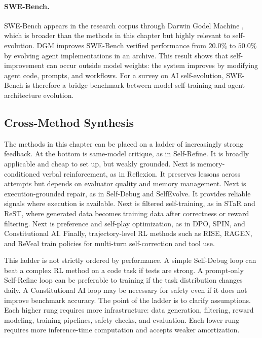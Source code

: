 \paragraph{SWE-Bench.} SWE-Bench \cite{swebench2023} appears in the research corpus through Darwin Godel Machine \cite{zhang2025darwin}, which is broader than the methods in this chapter but highly relevant to self-evolution. DGM \cite{zhang2025darwin} improves SWE-Bench verified performance from $20.0\%$ to $50.0\%$ by evolving agent implementations in an archive. This result shows that self-improvement can occur outside model weights: the system improves by modifying agent code, prompts, and workflows. For a survey on AI self-evolution, SWE-Bench is therefore a bridge benchmark between model self-training and agent architecture evolution.

\subsection{Cross-Method Synthesis}
\label{subsec:cross-method-synthesis}

The methods in this chapter can be placed on a ladder of increasingly strong feedback. At the bottom is same-model critique, as in Self-Refine. It is broadly applicable and cheap to set up, but weakly grounded. Next is memory-conditioned verbal reinforcement, as in Reflexion. It preserves lessons across attempts but depends on evaluator quality and memory management. Next is execution-grounded repair, as in Self-Debug and SelfEvolve. It provides reliable signals where execution is available. Next is filtered self-training, as in STaR and ReST, where generated data becomes training data after correctness or reward filtering. Next is preference and self-play optimization, as in DPO, SPIN, and Constitutional AI. Finally, trajectory-level RL methods such as RISE, RAGEN, and ReVeal train policies for multi-turn self-correction and tool use.

This ladder is not strictly ordered by performance. A simple Self-Debug loop can beat a complex RL method on a code task if tests are strong. A prompt-only Self-Refine loop can be preferable to training if the task distribution changes daily. A Constitutional AI loop may be necessary for safety even if it does not improve benchmark accuracy. The point of the ladder is to clarify assumptions. Each higher rung requires more infrastructure: data generation, filtering, reward modeling, training pipelines, safety checks, and evaluation. Each lower rung requires more inference-time computation and accepts weaker amortization.

